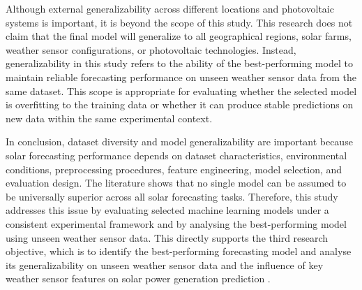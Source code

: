 Although external generalizability across different locations and photovoltaic systems is important, it is beyond the scope of this study. This research does not claim that the final model will generalize to all geographical regions, solar farms, weather sensor configurations, or photovoltaic technologies. Instead, generalizability in this study refers to the ability of the best-performing model to maintain reliable forecasting performance on unseen weather sensor data from the same dataset. This scope is appropriate for evaluating whether the selected model is overfitting to the training data or whether it can produce stable predictions on new data within the same experimental context.

In conclusion, dataset diversity and model generalizability are important because solar forecasting performance depends on dataset characteristics, environmental conditions, preprocessing procedures, feature engineering, model selection, and evaluation design. The literature shows that no single model can be assumed to be universally superior across all solar forecasting tasks. Therefore, this study addresses this issue by evaluating selected machine learning models under a consistent experimental framework and by analysing the best-performing model using unseen weather sensor data. This directly supports the third research objective, which is to identify the best-performing forecasting model and analyse its generalizability on unseen weather sensor data and the influence of key weather sensor features on solar power generation prediction \parencite{ArellanosTafur2025, Eren2025, Ma2025}.